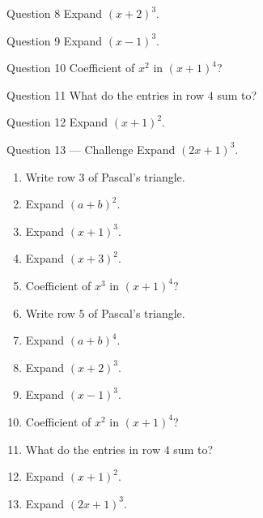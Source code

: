 \documentclass[11pt]{article}
\begin{document}
\begin{qbox}{Question 8}
Expand $(x+2)^3$.\workspace{2.4cm}
\end{qbox}

\begin{qbox}{Question 9}
Expand $(x-1)^3$.\workspace{2.4cm}
\end{qbox}

\begin{qbox}{Question 10}
Coefficient of $x^2$ in $(x+1)^4$?\workspace{2.4cm}
\end{qbox}

\begin{qbox}{Question 11}
What do the entries in row $4$ sum to?\workspace{2.4cm}
\end{qbox}

\begin{qbox}{Question 12}
Expand $(x+1)^2$.\workspace{2.4cm}
\end{qbox}

\begin{qbox}{Question 13 --- Challenge}
Expand $(2x+1)^3$.\workspace{3cm}
\end{qbox}

\clearpage
{}

\begin{recapbox}
\begin{multicols}{2}
\small
\begin{enumerate}[leftmargin=*,itemsep=3pt]
  \item Write row $3$ of Pascal's triangle.
  \item Expand $(a+b)^2$.
  \item Expand $(x+1)^3$.
  \item Expand $(x+3)^2$.
  \item Coefficient of $x^3$ in $(x+1)^4$?
  \item Write row $5$ of Pascal's triangle.
  \item Expand $(a+b)^4$.
  \item Expand $(x+2)^3$.
  \item Expand $(x-1)^3$.
  \item Coefficient of $x^2$ in $(x+1)^4$?
  \item What do the entries in row $4$ sum to?
  \item Expand $(x+1)^2$.
  \item Expand $(2x+1)^3$.
\end{enumerate}
\end{multicols}
\end{recapbox}
\end{document}
